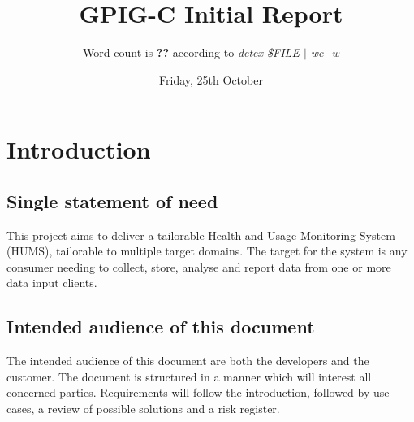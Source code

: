 \documentclass[10pt,a4paper]{article}
\begin{document}
\title{\vspace{-1cm}GPIG-C Initial Report}
\author{Word count is \textbf{??} according to \textsl{detex \$FILE $\vert$ wc -w}}
\date{Friday, 25th October}
\maketitle
\thispagestyle{fancy} %

\section{Introduction}
\subsection{Single statement of need}
This project aims to deliver a tailorable Health and Usage Monitoring System (HUMS), tailorable to multiple target domains. The target for the system is any consumer needing to collect, store, analyse and report data from one or more data input clients.
\subsection{Intended audience of this document}
The intended audience of this document are both the developers and the customer. The document is structured in a manner which will interest all concerned parties. Requirements will follow the introduction, followed by use cases, a review of possible solutions and a risk register.
\end{document}
